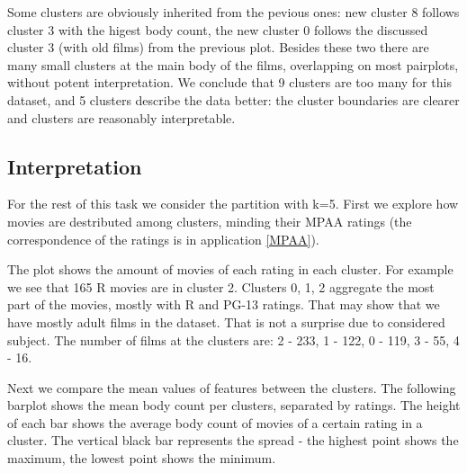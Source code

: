 \documentclass[a4paper,14pt]{article}
\begin{document}
 
    \begin{center}
\end{center}


Some clusters are obviously inherited from the pevious ones: new cluster 8 follows cluster 3 with the higest body count, the new cluster 0 follows the discussed cluster 3 (with old films) from the previous plot. Besides these two there are many small clusters at the main body of the films, overlapping on most  pairplots, without potent interpretation. We conclude that 9 clusters are too many for this dataset, and 5 clusters describe the data better: the cluster boundaries are clearer and clusters are reasonably interpretable.

\subsection{Interpretation}

For the rest of this task we consider the partition with k=5. First we explore how movies are destributed among clusters, minding their MPAA ratings (the correspondence of the ratings is in application \ref{MPAA}). 

           
\begin{center}
\end{center}

The plot shows the amount of movies of each rating in each cluster. For example we see that 165 R movies are in cluster 2. Clusters 0, 1, 2 aggregate the most part of the movies, mostly with R and PG-13 ratings. That may show that we have mostly adult films in the dataset. That is not a surprise due to considered subject. The number of films at the clusters are: 
2 - 233,
1  -  122,
0  -  119,
3  -   55,
4  -   16.

Next we compare the mean values of features between the clusters. The following barplot shows the mean body count per clusters, separated by ratings. The height of each bar shows the average body count of movies of a certain rating in a cluster. The vertical black bar represents the spread - the highest point shows the maximum, the lowest point shows the minimum.


            
\begin{center}
\end{center}
 
\end{document}
